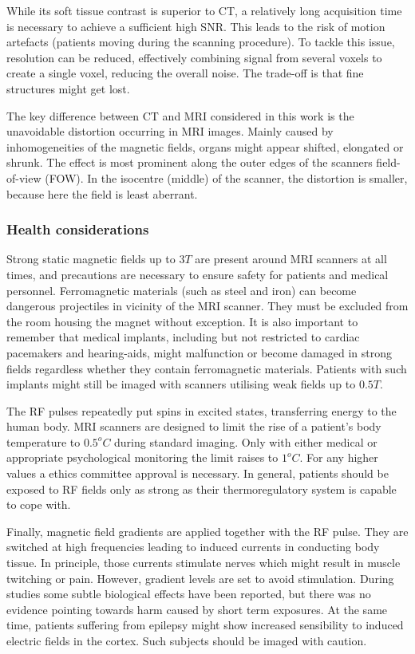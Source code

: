 While its soft tissue contrast is superior to CT, a relatively long acquisition time is necessary to achieve a sufficient high SNR.
This leads to the risk of motion artefacts (patients moving during the scanning procedure).
To tackle this issue, resolution can be reduced, effectively combining signal from several voxels to create a single voxel, reducing the overall noise.
The trade-off is that fine structures might get lost.

The key difference between CT and MRI considered in this work is the unavoidable distortion occurring in MRI images.
Mainly caused by inhomogeneities of the magnetic fields, organs might appear shifted, elongated or shrunk.
The effect is most prominent along the outer edges of the scanners field-of-view (FOW).
In the isocentre (middle) of the scanner, the distortion is smaller, because here the field is least aberrant.




\subsubsection{Health considerations}

Strong static magnetic fields up to $3T$ are present around MRI scanners at all times, and precautions are necessary to ensure safety for patients and medical personnel.
Ferromagnetic materials (such as steel and iron) can become dangerous projectiles in vicinity of the MRI scanner.
They must be excluded from the room housing the magnet without exception.
It is also important to remember that medical implants, including but not restricted to cardiac pacemakers and hearing-aids, might malfunction or become damaged in strong fields regardless whether they contain ferromagnetic materials.
Patients with such implants might still be imaged with scanners utilising weak fields up to $0.5T$.

The RF pulses repeatedly put spins in excited states, transferring energy to the human body. MRI scanners are designed to limit the rise of a patient's body temperature to $0.5^oC$ during standard imaging. Only with either medical or appropriate psychological monitoring the limit raises to $1^oC$. For any higher values a ethics committee approval is necessary.
In general, patients should be exposed to RF fields only as strong as their thermoregulatory system is capable to cope with.

Finally, magnetic field gradients are applied together with the RF pulse.
They are switched at high frequencies leading to induced currents in conducting body tissue.
In principle, those currents stimulate nerves which might result in muscle twitching or pain.
However, gradient levels are set to avoid stimulation.
During studies some subtle biological effects have been reported, but there was no evidence pointing towards harm caused by short term exposures.
At the same time, patients suffering from epilepsy might show increased sensibility to induced electric fields in the cortex.
Such subjects should be imaged with caution. \cite{Maidment2014}


